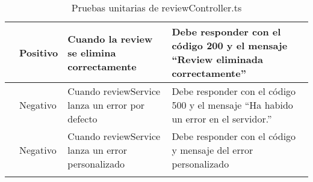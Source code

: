 \begin{small}
\begin{longtable}[H]{|>{\centering\arraybackslash}m{3cm}|>{\centering\arraybackslash}m{2cm}|>{\centering\arraybackslash}m{3cm}|>{\centering\arraybackslash}m{4cm}|}
		\multirow{3}{4cm}{DELETE /:id}         & Positivo              & Cuando la review se elimina correctamente         & Debe responder con el código 200 y el mensaje “Review eliminada correctamente”     \\
		\cline{2-4}
		                                       & Negativo              & Cuando reviewService lanza un error por defecto   & Debe responder con el código 500 y el mensaje “Ha habido un error en el servidor.” \\
		\cline{2-4}
		                                       & Negativo              & Cuando reviewService lanza un error personalizado & Debe responder con el código y mensaje del error personalizado                     \\
		\hline
		\caption{Pruebas unitarias de reviewController.ts}
	\end{longtable}
\end{small}

